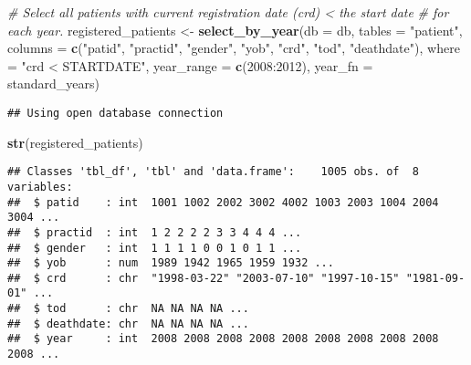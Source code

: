 \documentclass[]{article}
\newenvironment{Shaded}{\begin{snugshade}}{\end{snugshade}}
\newcommand{\KeywordTok}[1]{\textcolor[rgb]{0.13,0.29,0.53}{\textbf{{#1}}}}
\newcommand{\DataTypeTok}[1]{\textcolor[rgb]{0.13,0.29,0.53}{{#1}}}
\newcommand{\DecValTok}[1]{\textcolor[rgb]{0.00,0.00,0.81}{{#1}}}
\newcommand{\StringTok}[1]{\textcolor[rgb]{0.31,0.60,0.02}{{#1}}}
\newcommand{\CommentTok}[1]{\textcolor[rgb]{0.56,0.35,0.01}{\textit{{#1}}}}
\newcommand{\NormalTok}[1]{{#1}}
\begin{document}
\begin{Shaded}
\begin{Highlighting}[]
\CommentTok{# Select all patients with current registration date (crd) < the start date }
\CommentTok{# for each year.}
\NormalTok{registered_patients <-}\StringTok{ }\KeywordTok{select_by_year}\NormalTok{(}\DataTypeTok{db =} \NormalTok{db, }
                         \DataTypeTok{tables =} \StringTok{"patient"}\NormalTok{, }
                         \DataTypeTok{columns =} \KeywordTok{c}\NormalTok{(}\StringTok{"patid"}\NormalTok{, }\StringTok{"practid"}\NormalTok{, }\StringTok{"gender"}\NormalTok{, }
                                     \StringTok{"yob"}\NormalTok{, }\StringTok{"crd"}\NormalTok{, }\StringTok{"tod"}\NormalTok{, }\StringTok{"deathdate"}\NormalTok{), }
                         \DataTypeTok{where =} \StringTok{"crd < STARTDATE"}\NormalTok{,}
                         \DataTypeTok{year_range =} \KeywordTok{c}\NormalTok{(}\DecValTok{2008}\NormalTok{:}\DecValTok{2012}\NormalTok{), }
                         \DataTypeTok{year_fn =} \NormalTok{standard_years)}
\end{Highlighting}
\end{Shaded}

\begin{verbatim}
## Using open database connection
\end{verbatim}

\begin{Shaded}
\begin{Highlighting}[]
\KeywordTok{str}\NormalTok{(registered_patients)}
\end{Highlighting}
\end{Shaded}

\begin{verbatim}
## Classes 'tbl_df', 'tbl' and 'data.frame':    1005 obs. of  8 variables:
##  $ patid    : int  1001 1002 2002 3002 4002 1003 2003 1004 2004 3004 ...
##  $ practid  : int  1 2 2 2 2 3 3 4 4 4 ...
##  $ gender   : int  1 1 1 1 0 0 1 0 1 1 ...
##  $ yob      : num  1989 1942 1965 1959 1932 ...
##  $ crd      : chr  "1998-03-22" "2003-07-10" "1997-10-15" "1981-09-01" ...
##  $ tod      : chr  NA NA NA NA ...
##  $ deathdate: chr  NA NA NA NA ...
##  $ year     : int  2008 2008 2008 2008 2008 2008 2008 2008 2008 2008 ...
\end{verbatim}

\begin{Shaded}
\end{Shaded}
\end{document}
